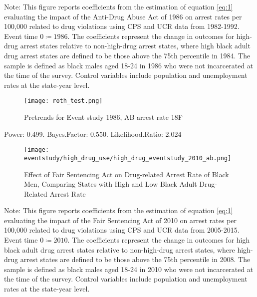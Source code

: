   \begin{footnotesize}
    \noindent Note: This figure reports coefficients from the estimation of equation \ref{eq:1} evaluating the impact of the Anti-Drug Abuse Act of 1986 on arrest rates per 100,000 related to drug violations using CPS and UCR data from 1982-1992. Event time $0 \coloneqq 1986$. The coefficients represent the change in outcomes for high-drug arrest states relative to non-high-drug arrest states, where high black adult drug arrest states are defined to be those above the 75th percentile in 1984. The sample is defined as black males aged 18-24 in 1986 who were not incarcerated at the time of the survey. Control variables include population and unemployment rates at the state-year level. 
  \end{footnotesize}
  
  \clearpage
  
  \begin{figure*}[h]
    \caption{Pretrends for Event study 1986, AB arrest rate 18F}
    \texttt{[image: roth\_test.png]}
  \end{figure*}
  
  Power: 0.499. Bayes.Factor: 0.550.  Likelihood.Ratio: 2.024
  
  \clearpage
  
  \begin{figure}[h]
    \caption{Effect of Fair Sentencing Act on Drug-related Arrest Rate of Black Men, Comparing States with High and Low Black Adult Drug-Related Arrest Rate}
    \centering
    \texttt{[image: eventstudy/high\_drug\_use/high\_drug\_eventstudy\_2010\_ab.png]}
    \label{fig:ab_es_2010}
  \end{figure}
  
  \begin{footnotesize}
    \noindent Note: This figure reports coefficients from the estimation of equation \ref{eq:1} evaluating the impact of the Fair Sentencing Act of 2010 on arrest rates per 100,000 related to drug violations using CPS and UCR data from 2005-2015. Event time $0 \coloneqq 2010$. The coefficients represent the change in outcomes for high black adult drug arrest states relative to non-high-drug arrest states, where high-drug arrest states are defined to be those above the 75th percentile in 2008. The sample is defined as black males aged 18-24 in 2010 who were not incarcerated at the time of the survey. Control variables include population and unemployment rates at the state-year level. 
  \end{footnotesize}

